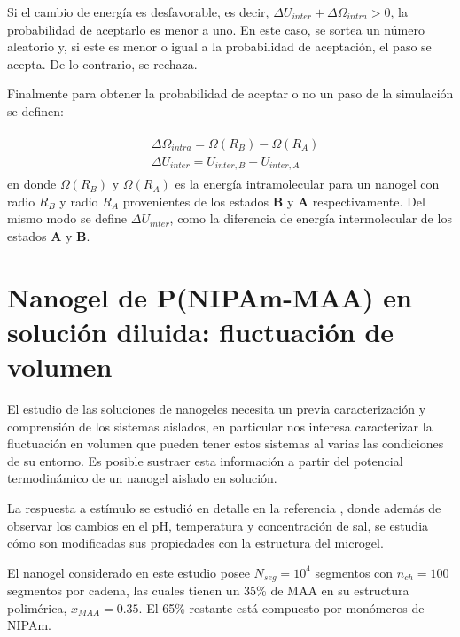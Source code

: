 	
	Si el cambio de energ\'ia es desfavorable, es decir, $\Delta U_{inter} + \Delta \Omega_{intra} > 0$, la probabilidad de aceptarlo es menor a uno. En este caso, se sortea un n\'umero aleatorio y, si este es menor o igual a la probabilidad de aceptaci\'on, el paso se acepta. De lo contrario, se rechaza. 
	
Finalmente para obtener la probabilidad de aceptar o no un paso de la simulaci\'on se definen:
	
	\begin{align}
		\begin{aligned}
			& \Delta \Omega_{intra} = \Omega(R_B) - \Omega(R_A) \\
			& \Delta U_{inter} = U_{inter,B} - U_{inter,A}
		\end{aligned}
	\end{align}
	\noindent en donde $\Omega(R_B)$ y $\Omega(R_A)$ es la energ\'ia intramolecular para un nanogel con radio $R_B$ y radio $R_A$ provenientes de los estados \textbf{B} y \textbf{A} respectivamente. Del mismo modo se define $\Delta U_{inter}$, como la diferencia de energ\'ia intermolecular de los estados \textbf{A} y \textbf{B}.
	

	
	\section{Nanogel de P(NIPAm-MAA) en soluci\'on diluida: fluctuaci\'on de volumen} \label{sec:fluctuacion-volumen}
	
	El estudio de las soluciones de nanogeles necesita un previa caracterizaci\'on y comprensi\'on de los sistemas aislados, en particular nos interesa caracterizar la fluctuaci\'on en volumen que pueden tener estos sistemas al varias las condiciones de su entorno.  Es posible sustraer esta informaci\'on a partir del potencial termodin\'amico de un nanogel aislado en soluci\'on.
	
	La respuesta a est\'imulo se estudi\'o en detalle en la referencia \cite{perez2021thermodynamic}, donde adem\'as de observar los cambios en el pH, temperatura y concentraci\'on de sal, se estudia c\'omo son modificadas sus propiedades con la estructura del microgel.
	
	El nanogel considerado en este estudio posee $N_{seg} = 10^4$ segmentos con $n_{ch} = 100$ segmentos por cadena, las cuales tienen un 35\% de MAA en su estructura polim\'erica, $x_{MAA} = 0.35$. El 65\% restante est\'a compuesto por mon\'omeros de NIPAm.
	
